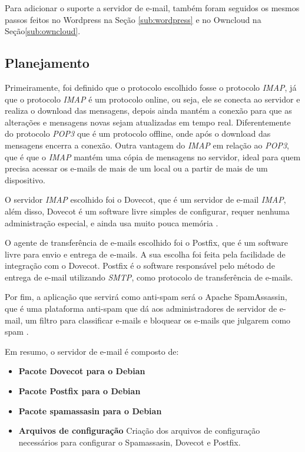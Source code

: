 Para adicionar o suporte a servidor de e-mail, também foram seguidos os mesmos passos
feitos no Wordpress na Seção \ref{sub:wordpress} e no Owncloud na Seção\ref{sub:owncloud}. 

\subsection{Planejamento}

Primeiramente, foi definido que o protocolo escolhido fosse o protocolo \textit{IMAP}, já
que o protocolo \textit{IMAP} é um protocolo online, ou seja, ele se conecta ao servidor
e realiza o download das mensagens, depois ainda  mantém a conexão para que
as alterações e mensagens novas sejam atualizadas em tempo real. Diferentemente do
protocolo \textit{POP3} que é um protocolo offline, onde após o download das mensagens encerra
a conexão. Outra vantagem do \textit{IMAP} em relação ao \textit{POP3}, que é que o 
\textit{IMAP} mantém uma cópia de mensagens no servidor, ideal para quem precisa 
acessar os e-mails de mais de um local ou a partir de mais de um dispositivo.

O servidor \textit{IMAP} escolhido foi o Dovecot, que é um servidor de e-mail
\textit{IMAP}, além disso, Dovecot é um software livre simples de configurar, requer nenhuma
administração especial, e ainda usa muito pouca memória \cite{dovecot}. 

O agente de transferência de e-mails escolhido foi o Postfix, que é um software
livre para envio e entrega de e-mails. A sua escolha foi feita pela facilidade de
integração com o Dovecot. Postfix é o software responsável pelo método de entrega de e-mail
utilizando \textit{SMTP}, como protocolo de transferência de e-mails. 

Por fim, a aplicação que servirá como anti-spam será o Apache SpamAssassin, que 
é uma plataforma anti-spam que dá aos administradores de servidor de e-mail, 
um filtro para classificar e-mails e bloquear os e-mails que julgarem como spam \cite{spam}. 

Em resumo, o servidor de e-mail é composto de:

\begin{itemize}
   \item \textbf{Pacote Dovecot para o Debian}
   \item \textbf{Pacote Postfix para o Debian}
   \item \textbf{Pacote spamassasin para o Debian}
   \item \textbf{Arquivos de configuração} Criação dos arquivos de configuração
   necessários para configurar o Spamassasin, Dovecot e Postfix.
\end{itemize}

